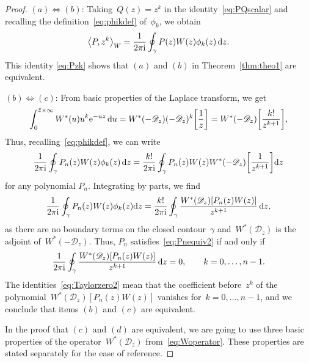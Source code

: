 \documentclass[10pt,a4paper]{article}
\numberwithin{equation}{section}
\begin{document}
 \begin{proof}%
 $(a) \Leftrightarrow (b)$: Taking~$Q(z) = z^k$ in the identity~\eqref{eq:PQscalar} and recalling the definition~\eqref{eq:phikdef} of~$\phi_k$, we obtain
 \begin{equation}
 \label{eq:Pzk}
 \big\langle P, z^k \big\rangle_W = \frac{1}{2\pi {\rm i}} \oint_\gamma P(z) W(z) \phi_k(z)\, {\rm d}z.
 \end{equation}
 This identity \eqref{eq:Pzk} shows that $(a)$ and $(b)$ in Theorem~\ref{thm:theo1}
 are equivalent.

\smallskip\noindent $(b) \Leftrightarrow (c)$:
 From basic properties of the Laplace transform, we get
 \begin{equation*}
 \int_{0}^{\bar z \times \infty} W^*(u) u^k {\rm e}^{-uz}\, {\rm d}u = W^*(-\mathscr{D}_z) (-\mathscr{D}_z)^k \bigg[\frac{1}{z}\bigg] = W^*(-\mathscr{D}_z) \bigg[\frac{k!}{z^{k+1}}\bigg],
 \end{equation*}
 Thus, recalling~\eqref{eq:phikdef}, we can write
 \begin{equation*}
 \frac{1}{2\pi {\rm i}} \oint_{\gamma} P_n(z) W(z) \phi_k(z)\, {\rm d}z = \frac{k!}{2\pi {\rm i}} \oint_{\gamma} P_n(z)W(z) W^*(-\mathscr{D}_z) \bigg[\frac{1}{z^{k+1}}\bigg] {\rm d}z
 \end{equation*}
 for any polynomial $P_n$. Integrating by parts, we find
 \begin{equation*}
 \frac{1}{2\pi {\rm i}} \oint_{\gamma} P_n(z) W(z) \phi_k(z) {\rm d}z = \frac{k!}{2\pi {\rm i}} \oint_{\gamma} \frac{W^*(\mathscr{D}_z)[P_n(z)W(z)]}{z^{k+1}} \, {\rm d}z,
 \end{equation*}
 as there are no boundary terms on the closed contour~$\gamma$ and~$W^*(\mathscr{D}_z)$ is the adjoint of~$W^*(-\mathscr{D}_z)$. Thus, $P_n$ satisfies~\eqref{eq:Pnequiv2} if and only if
 \begin{equation}
 \label{eq:Taylorzero2}
 \frac{1}{2\pi {\rm i}}
 \oint_{\gamma} \frac{W^*(\mathscr{D}_z)[P_n(z)W(z)]}{z^{k+1}} \, {\rm d}z =0, \qquad k =0, \dots, n-1.
 \end{equation}
 The identities~\eqref{eq:Taylorzero2} mean that the coefficient before~$z^k$ of the polynomial~$W^*(\mathscr{D}_z)[P_n(z)W(z)]$ vanishes for~$k=0, \dots, n-1$, and we conclude that items $(b)$ and $(c)$ are equivalent.

 In the proof that $(c)$ and $(d)$ are equivalent, we are going to use three basic properties of the operator~$W^*(\mathscr{D}_z)$ from~\eqref{eq:Woperator}. These properties are stated separately for the ease of reference.


\end{proof}
\end{document}
